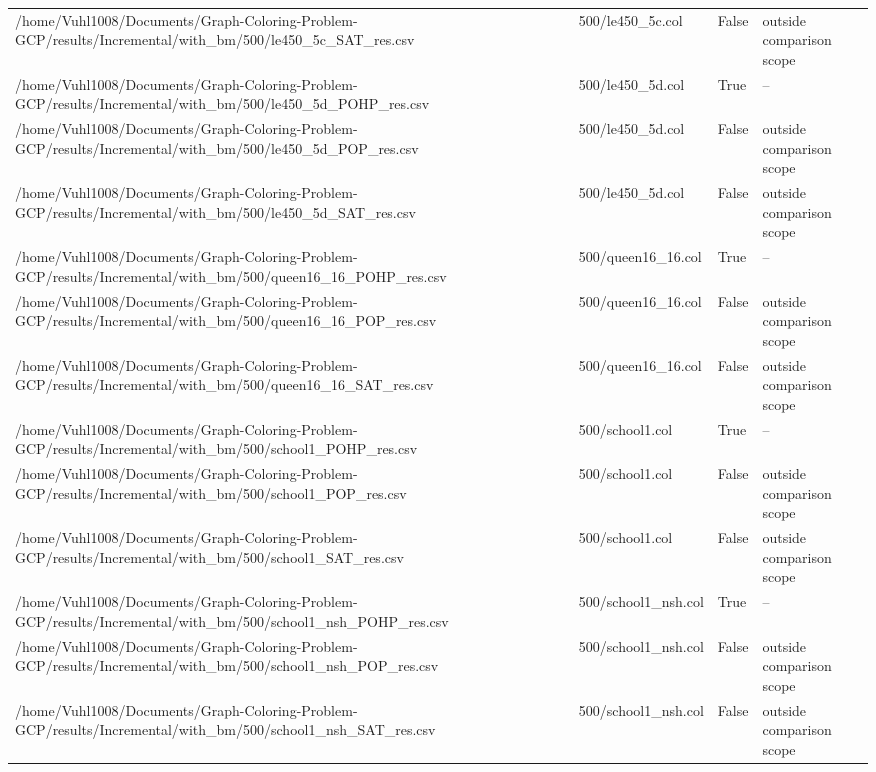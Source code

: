 \begin{table}[htbp]
\begin{tabular}{llll}
/home/Vuhl1008/Documents/Graph-Coloring-Problem-GCP/results/Incremental/with\_bm/500/le450\_5c\_SAT\_res.csv & 500/le450\_5c.col & False & outside comparison scope \\
/home/Vuhl1008/Documents/Graph-Coloring-Problem-GCP/results/Incremental/with\_bm/500/le450\_5d\_POHP\_res.csv & 500/le450\_5d.col & True & -- \\
/home/Vuhl1008/Documents/Graph-Coloring-Problem-GCP/results/Incremental/with\_bm/500/le450\_5d\_POP\_res.csv & 500/le450\_5d.col & False & outside comparison scope \\
/home/Vuhl1008/Documents/Graph-Coloring-Problem-GCP/results/Incremental/with\_bm/500/le450\_5d\_SAT\_res.csv & 500/le450\_5d.col & False & outside comparison scope \\
/home/Vuhl1008/Documents/Graph-Coloring-Problem-GCP/results/Incremental/with\_bm/500/queen16\_16\_POHP\_res.csv & 500/queen16\_16.col & True & -- \\
/home/Vuhl1008/Documents/Graph-Coloring-Problem-GCP/results/Incremental/with\_bm/500/queen16\_16\_POP\_res.csv & 500/queen16\_16.col & False & outside comparison scope \\
/home/Vuhl1008/Documents/Graph-Coloring-Problem-GCP/results/Incremental/with\_bm/500/queen16\_16\_SAT\_res.csv & 500/queen16\_16.col & False & outside comparison scope \\
/home/Vuhl1008/Documents/Graph-Coloring-Problem-GCP/results/Incremental/with\_bm/500/school1\_POHP\_res.csv & 500/school1.col & True & -- \\
/home/Vuhl1008/Documents/Graph-Coloring-Problem-GCP/results/Incremental/with\_bm/500/school1\_POP\_res.csv & 500/school1.col & False & outside comparison scope \\
/home/Vuhl1008/Documents/Graph-Coloring-Problem-GCP/results/Incremental/with\_bm/500/school1\_SAT\_res.csv & 500/school1.col & False & outside comparison scope \\
/home/Vuhl1008/Documents/Graph-Coloring-Problem-GCP/results/Incremental/with\_bm/500/school1\_nsh\_POHP\_res.csv & 500/school1\_nsh.col & True & -- \\
/home/Vuhl1008/Documents/Graph-Coloring-Problem-GCP/results/Incremental/with\_bm/500/school1\_nsh\_POP\_res.csv & 500/school1\_nsh.col & False & outside comparison scope \\
/home/Vuhl1008/Documents/Graph-Coloring-Problem-GCP/results/Incremental/with\_bm/500/school1\_nsh\_SAT\_res.csv & 500/school1\_nsh.col & False & outside comparison scope \\

\end{tabular}
\end{table}
